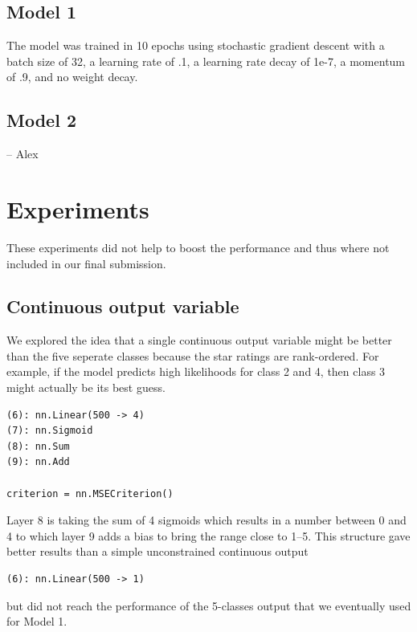 \documentclass{article} %
\begin{document}
\subsection{Model 1}

The model was trained in 10 epochs using stochastic gradient descent with a batch size of 32, a learning rate of .1, a learning rate decay of 1e-7, a momentum of .9, and no weight decay.

\subsection{Model 2}

-- Alex


\section{Experiments}

These experiments did not help to boost the performance and thus where not included in our final submission.

\subsection{Continuous output variable}
We explored the idea that a single continuous output variable might be better than the five seperate classes because the star ratings are rank-ordered. 
For example, if the model predicts high likelihoods for class 2 and 4, then class 3 might actually be its best guess.
\begin{verbatim}
(6): nn.Linear(500 -> 4)
(7): nn.Sigmoid
(8): nn.Sum
(9): nn.Add

criterion = nn.MSECriterion()
\end{verbatim}
Layer 8 is taking the sum of 4 sigmoids which results in a number between 0 and 4 to which layer 9 adds a bias to bring the range close to 1--5.
This structure gave better results than a simple unconstrained continuous output 
\begin{verbatim}
(6): nn.Linear(500 -> 1)
\end{verbatim}
but did not reach the performance of the 5-classes output that we eventually used for Model 1.
\end{document}
